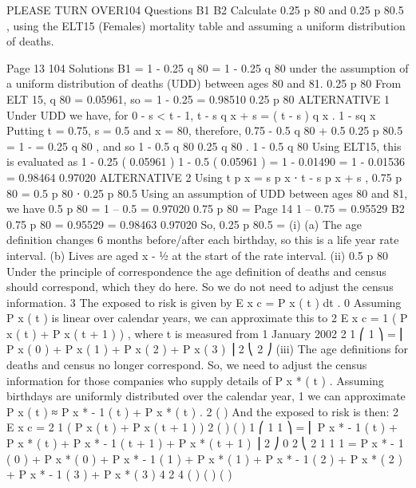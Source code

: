 \documentclass[a4paper,12pt]{article}
\begin{document}
PLEASE TURN OVER104 Questions
B1
B2
Calculate 0.25 p 80 and 0.25 p 80.5 , using the ELT15 (Females) mortality table and
assuming a uniform distribution of deaths.



Page 13
104 Solutions
B1
= 1 - 0.25 q 80 = 1 - 0.25 \times q 80
under the assumption of a uniform distribution of deaths (UDD)
between ages 80 and 81.
0.25 p 80
From ELT 15, q 80 = 0.05961, so
= 1 - 0.25  = 0.98510
0.25 p 80
ALTERNATIVE 1
Under UDD we have, for 0 - s < t - 1,
t - s q x + s
=
( t - s ) q x
.
1 - sq x
Putting t = 0.75, s = 0.5 and x = 80, therefore,
0.75 - 0.5 q 80 + 0.5
0.25 p 80.5
= 1 -
=
0.25 q 80
, and so
1 - 0.5 q 80
0.25 q 80
.
1 - 0.5 q 80
Using ELT15, this is evaluated as
1 -
0.25 ( 0.05961 )
1 - 0.5 ( 0.05961 )
= 1 -
0.01490
= 1 - 0.01536 = 0.98464
0.97020
ALTERNATIVE 2
Using
t
p x = s p x ⋅ t - s p x + s ,
0.75 p 80 = 0.5 p 80 ⋅ 0.25 p 80.5
Using an assumption of UDD between ages 80 and 81, we have
0.5 p 80
= 1 – 0.5  = 0.97020
0.75 p 80 =
Page 14
1 – 0.75  = 0.95529
B2
0.75 p 80
=
0.95529
= 0.98463
0.97020
So, 0.25 p 80.5 =
(i) (a) The age definition changes 6 months before/after each birthday, so this
is a life year rate interval.
(b) Lives are aged x - 1⁄2 at the start of the rate interval.
(ii)
0.5 p 80
Under the principle of correspondence the age definition of deaths and census
should correspond, which they do here. So we do not need to adjust the
census information.
3
The exposed to risk is given by
E x c
= \int  P x ( t ) dt .
0
Assuming P x ( t ) is linear over calendar years, we can approximate this to
2
E x c = 
1
( P x ( t ) + P x ( t + 1 ) ) , where t is measured from 1 January 2002
2
1
⎛ 1
⎞
= ⎜ P x ( 0 ) + P x ( 1 ) + P x ( 2 ) + P x ( 3 ) ⎟
2
⎝ 2
⎠
(iii)
The age definitions for deaths and census no longer correspond. So, we need
to adjust the census information for those companies who supply details of
P x * ( t ) .
Assuming birthdays are uniformly distributed over the calendar year,
1
we can approximate P x ( t ) ≈ P x * - 1 ( t ) + P x * ( t ) .
2
(
)
And the exposed to risk is then:
2
E x c = 
2
1
( P x ( t ) + P x ( t + 1 ) )
2
(
) (
)
1 ⎛ 1
1
⎞
= \sum  ⎜ P x * - 1 ( t ) + P x * ( t ) + P x * - 1 ( t + 1 ) + P x * ( t + 1 ) ⎟
2
⎠
0 2 ⎝ 2
1
1
1
= P x * - 1 ( 0 ) + P x * ( 0 ) + P x * - 1 ( 1 ) + P x * ( 1 ) + P x * - 1 ( 2 ) + P x * ( 2 ) + P x * - 1 ( 3 ) + P x * ( 3 )
4
2
4
(
) (
) (
)
\end{document}
